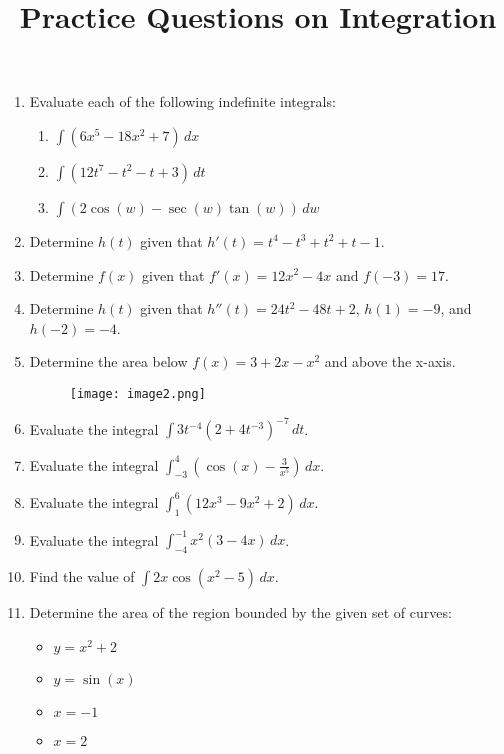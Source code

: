 \documentclass[11pt]{article}
\title{Practice Questions on Integration}
\author{}
\begin{document}
\maketitle
\thispagestyle{fancy}

\begin{enumerate}

    \item Evaluate each of the following indefinite integrals:

\begin{enumerate}
    \item \( \int \left( 6x^5 - 18x^2 + 7 \right) \, dx \)
    \item \( \int \left( 12t^7 - t^2 - t + 3 \right) \, dt \)
    \item \(\int \left( 2 \cos(w) - \sec(w) \tan(w) \right) \, dw\)
\end{enumerate}

    \item Determine \( h(t) \) given that \( h'(t) = t^4 - t^3 + t^2 + t - 1 \).
    \item Determine \( f(x) \) given that \( f'(x) = 12x^2 - 4x \) and \( f(-3) = 17 \).
    \item Determine \( h(t) \) given that \( h''(t) = 24t^2 - 48t + 2 \), \( h(1) = -9 \), and \( h(-2) = -4 \).
    
    
    \item Determine the area below \( f(x) = 3 + 2x - x^2 \) and above the x-axis.

    \begin{figure}[h]
        \centering
        \texttt{[image: image2.png]}

    \end{figure}
    
    
    \item Evaluate the integral \( \int 3t^{-4} (2 + 4t^{-3})^{-7} \, dt \).
    \item Evaluate the integral \( \int_{-3}^{4} \left( \cos(x) - \frac{3}{x^5} \right) \, dx \).
    \item Evaluate the integral \( \int_{1}^{6} \left( 12x^3 - 9x^2 + 2 \right) \, dx \).
    \item Evaluate the integral \( \int_{-4}^{-1} x^2 (3 - 4x) \, dx \).

    
    \item Find the value of \( \int 2x \cos(x^2 - 5) \, dx \).
\newpage
    \item Determine the area of the region bounded by the given set of curves:
    \begin{itemize}
        \item \( y = x^2 + 2 \)
        \item \( y = \sin(x) \)
        \item \( x = -1 \)
        \item \( x = 2 \)
    \end{itemize}


\end{enumerate}
\end{document}
